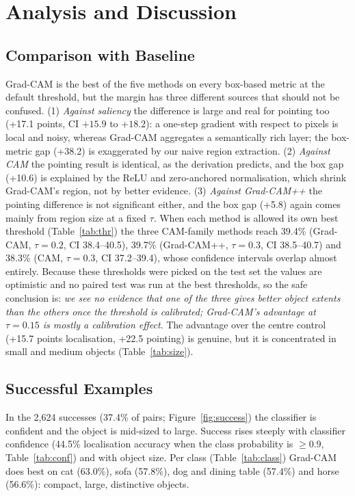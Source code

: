 \documentclass[11pt,a4paper]{article}
\newcommand{\GC}{Grad-CAM}
\begin{document}
\section{Analysis and Discussion}
\subsection{Comparison with Baseline}
\GC{} is the best of the five methods on every box-based metric at the default threshold, but the margin has three different sources that should not be confused. (1) \emph{Against saliency} the difference is large and real for pointing too (+17.1 points, CI $+15.9$ to $+18.2$): a one-step gradient with respect to pixels is local and noisy, whereas \GC{} aggregates a semantically rich layer; the box-metric gap (+38.2) is exaggerated by our naive region extraction. (2) \emph{Against CAM} the pointing result is identical, as the derivation predicts, and the box gap (+10.6) is explained by the ReLU and zero-anchored normalisation, which shrink \GC's region, not by better evidence. (3) \emph{Against Grad-CAM++} the pointing difference is not significant either, and the box gap (+5.8) again comes mainly from region size at a fixed $\tau$. When each method is allowed its own best threshold (Table~\ref{tab:thr}) the three CAM-family methods reach 39.4\% (\GC, $\tau=0.2$, CI 38.4--40.5), 39.7\% (Grad-CAM++, $\tau=0.3$, CI 38.5--40.7) and 38.3\% (CAM, $\tau=0.3$, CI 37.2--39.4), whose confidence intervals overlap almost entirely. Because these thresholds were picked on the test set the values are optimistic and no paired test was run at the best thresholds, so the safe conclusion is: \emph{we see no evidence that one of the three gives better object extents than the others once the threshold is calibrated; \GC's advantage at $\tau=0.15$ is mostly a calibration effect}. The advantage over the centre control (+15.7 points localisation, +22.5 pointing) is genuine, but it is concentrated in small and medium objects (Table~\ref{tab:size}).
\subsection{Successful Examples}
In the 2{,}624 successes (37.4\% of pairs; Figure~\ref{fig:success}) the classifier is confident and the object is mid-sized to large. Success rises steeply with classifier confidence (44.5\% localisation accuracy when the class probability is $\ge0.9$, Table~\ref{tab:conf}) and with object size. Per class (Table~\ref{tab:class}) \GC{} does best on cat (63.0\%), sofa (57.8\%), dog and dining table (57.4\%) and horse (56.6\%): compact, large, distinctive objects.
\end{document}
